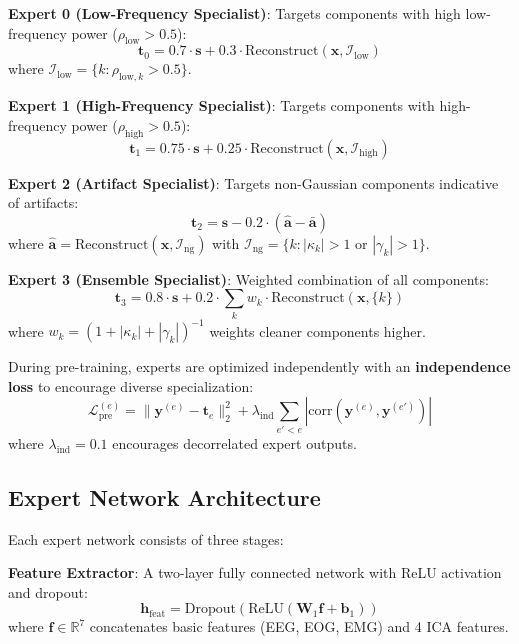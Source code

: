 \documentclass[journal]{IEEEtran}
\begin{document}
\textbf{Expert 0 (Low-Frequency Specialist)}: Targets components with high low-frequency power ($\rho_{\text{low}} > 0.5$):
\begin{equation}
\mathbf{t}_0 = 0.7 \cdot \mathbf{s} + 0.3 \cdot \text{Reconstruct}(\mathbf{x}, \mathcal{I}_{\text{low}})
\end{equation}
where $\mathcal{I}_{\text{low}} = \{k : \rho_{\text{low},k} > 0.5\}$.

\textbf{Expert 1 (High-Frequency Specialist)}: Targets components with high-frequency power ($\rho_{\text{high}} > 0.5$):
\begin{equation}
\mathbf{t}_1 = 0.75 \cdot \mathbf{s} + 0.25 \cdot \text{Reconstruct}(\mathbf{x}, \mathcal{I}_{\text{high}})
\end{equation}

\textbf{Expert 2 (Artifact Specialist)}: Targets non-Gaussian components indicative of artifacts:
\begin{equation}
\mathbf{t}_2 = \mathbf{s} - 0.2 \cdot (\hat{\mathbf{a}} - \bar{\mathbf{a}})
\end{equation}
where $\hat{\mathbf{a}} = \text{Reconstruct}(\mathbf{x}, \mathcal{I}_{\text{ng}})$ with $\mathcal{I}_{\text{ng}} = \{k : |\kappa_k| > 1 \text{ or } |\gamma_k| > 1\}$.

\textbf{Expert 3 (Ensemble Specialist)}: Weighted combination of all components:
\begin{equation}
\mathbf{t}_3 = 0.8 \cdot \mathbf{s} + 0.2 \cdot \sum_k w_k \cdot \text{Reconstruct}(\mathbf{x}, \{k\})
\end{equation}
where $w_k = (1 + |\kappa_k| + |\gamma_k|)^{-1}$ weights cleaner components higher.

During pre-training, experts are optimized independently with an \textbf{independence loss} to encourage diverse specialization:
\begin{equation}
\mathcal{L}_{\text{pre}}^{(e)} = \|\mathbf{y}^{(e)} - \mathbf{t}_e\|_2^2 + \lambda_{\text{ind}} \sum_{e' < e} |\text{corr}(\mathbf{y}^{(e)}, \mathbf{y}^{(e')})|
\end{equation}
where $\lambda_{\text{ind}} = 0.1$ encourages decorrelated expert outputs.

\subsection{Expert Network Architecture}

Each expert network consists of three stages:

\textbf{Feature Extractor}: A two-layer fully connected network with ReLU activation and dropout:
\begin{equation}
\mathbf{h}_{\text{feat}} = \text{Dropout}(\text{ReLU}(\mathbf{W}_1 \mathbf{f} + \mathbf{b}_1))
\end{equation}
where $\mathbf{f} \in \mathbb{R}^7$ concatenates basic features (EEG, EOG, EMG) and 4 ICA features.
\end{document}
